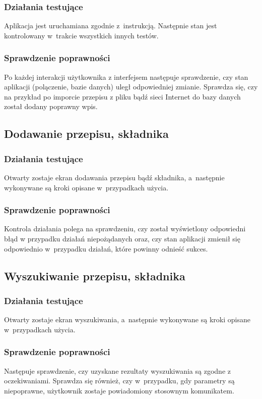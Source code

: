 \documentclass[12pt,leqno, twoside]{mwart}
\begin{document}
\subsubsection{Działania testujące}
\noindent Aplikacja jest uruchamiana zgodnie z~instrukcją. Następnie stan jest kontrolowany w~trakcie wszystkich innych testów.

\subsubsection{Sprawdzenie poprawności}
\noindent Po każdej interakcji użytkownika z interfejsem następuje sprawdzenie, czy stan aplikacji (polączenie, bazie
danych) uległ odpowiedniej zmianie. Sprawdza się, czy na przykład po imporcie przepisu z pliku bądź sieci Internet do
bazy danych został dodany poprawny wpis.

\subsection{Dodawanie przepisu, składnika}
\subsubsection{Działania testujące}
\noindent Otwarty zostaje ekran dodawania przepisu bądź składnika, a~następnie wykonywane są kroki opisane w~przypadkach
użycia.

\subsubsection{Sprawdzenie poprawności}
\noindent Kontrola działania polega na sprawdzeniu, czy został wyświetlony odpowiedni błąd w przypadku działań
niepożądanych oraz, czy stan aplikacji zmienił się odpowiednio w~przypadku działań, które powinny odnieść sukces.

\subsection{Wyszukiwanie przepisu, składnika}
\subsubsection{Działania testujące}
\noindent Otwarty zostaje ekran wyszukiwania, a~następnie wykonywane są kroki opisane w~przypadkach
użycia.

\subsubsection{Sprawdzenie poprawności}
\noindent Następuje sprawdzenie, czy uzyskane rezultaty wyszukiwania są zgodne z oczekiwaniami. Sprawdza się również, czy
w~przypadku, gdy parametry są niepoprawne, użytkownik zostaje powiadomiony stosownym komunikatem.
\end{document}
